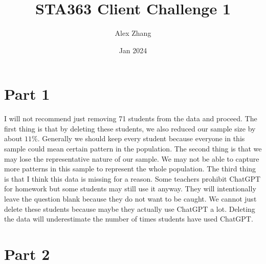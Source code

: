 \documentclass{article}
\title{STA363 Client Challenge 1}
\author{Alex Zhang}
\date{Jan 2024}
\begin{document}
\maketitle
\section*{Part 1}
I will not recommend just removing 71 students from the data and proceed. 
The first thing is that by deleting these students, we also reduced our sample size by about $11\%$. 
Generally we should keep every student because everyone in this sample could mean certain pattern in the population.
The second thing is that we may lose the representative nature of our sample.
We may not be able to capture more patterns in this sample to represent the whole population.
The third thing is that I think this data is missing for a reason.
Some teachers prohibit ChatGPT for homework but some students may still use it anyway.
They will intentionally leave the question blank because they do not want to be caught.
We cannot just delete these students because maybe they actually use ChatGPT a lot.
Deleting the data will underestimate the number of times students have used ChatGPT.
 


\section*{Part 2}
\end{document}
